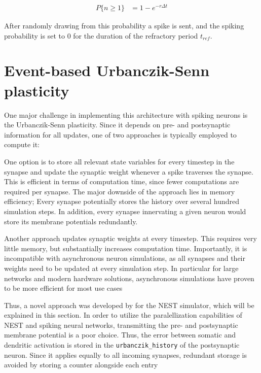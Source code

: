 \begin{align}
  P\{ \textit{n} \geq 1\} & = 1 - e^{-r \Delta t}
\end{align}


After randomly drawing from this probability a spike is sent, and the spiking probability is set to 0 for the duration
of the refractory period $t_{ref}$.

\section{Event-based Urbanczik-Senn plasticity}

One major challenge in implementing this architecture with spiking neurons is the Urbanczik-Senn plasticity. Since it
depends on pre- and postsynaptic information for all updates, one of two approaches is typically employed to compute it:

One option is to store all relevant state variables for every timestep in the synapse and update the synaptic weight
whenever a spike traverses the synapse. This is efficient in terms of computation time, since fewer computations are
required per synapse. The major downside of the approach lies in memory efficiency; Every synapse potentially stores the
history over several hundred simulation steps. In addition, every synapse innervating a given neuron would store its
membrane potentials redundantly.

Another approach updates synaptic weights at every timestep. This requires very little memory, but substantially
increases computation time. Importantly, it is incompatible with asynchronous neuron simulations, as all synapses and
their weights need to be updated at every simulation step. In particular for large networks and modern hardware
solutions, asynchronous simulations have proven to be more efficient for most use cases 

Thus, a novel approach was developed by \cite{Stapmanns2021} for the NEST simulator, which will be explained in this
section. In order to utilize the paralellization capabilities of NEST and spiking neural networks, transmitting the pre-
and postsynaptic membrane potential is a poor choice. Thus, the error between somatic and dendritic activation is stored
in the \texttt{urbanczik\_history} of the postsynaptic neuron. Since it applies equally to all incoming synapses,
redundant storage is avoided by storing a counter alongside each entry



